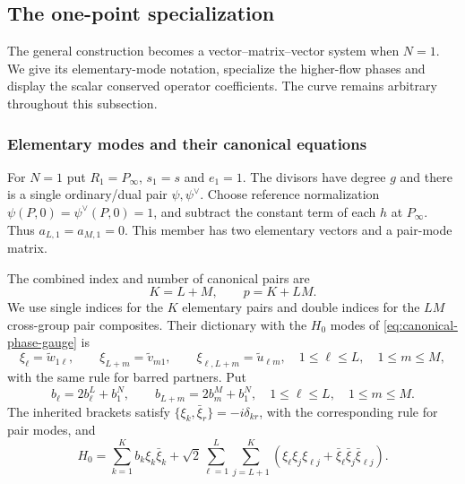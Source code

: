 \subsection{The one-point specialization}
\label{sec:BA-one-point-specialization}

The general construction becomes a vector--matrix--vector system
when $N=1$. We give its elementary-mode notation, specialize the
higher-flow phases and display the scalar conserved operator coefficients.
The curve remains arbitrary throughout this subsection.

\subsubsection{Elementary modes and their canonical equations}
\label{sec:BA-one-point}

For $N=1$ put $R_1=P_\infty$, $s_1=s$ and $e_1=1$.
The divisors have degree $g$ and there is a single ordinary/dual pair
$\psi,\psi^\vee$. Choose reference normalization
$\psi(P,0)=\psi^\vee(P,0)=1$, and subtract the constant term of
each $h$ at $P_\infty$. Thus $a_{L,1}=a_{M,1}=0$.
This member has two elementary vectors and a pair-mode matrix.

The combined index and number of canonical pairs are
\begin{equation}\label{eq:BA-mode-counts}
 K=L+M,\qquad p=K+LM.
\end{equation}
We use single indices for the $K$ elementary pairs and double indices
for the $LM$ cross-group pair composites. Their dictionary with the
$H_0$ modes of \cref{eq:canonical-phase-gauge} is
\begin{equation}\label{eq:BA-mode-dictionary}
 \xi_{\ell}=\tilde w_{1\ell},\qquad
 \xi_{L+m}=\tilde v_{m1},\qquad
 \xi_{\ell,L+m}=\tilde u_{\ell m},
 \quad1\leq\ell\leq L,\quad1\leq m\leq M,
\end{equation}
with the same rule for barred partners. Put
\begin{equation}\label{eq:BA-phase-dictionary}
 b_{\ell}=2b_{\ell}^L+b_1^N,\qquad b_{L+m}=2b_m^M+b_1^N,
 \quad1\leq\ell\leq L,\quad1\leq m\leq M.
\end{equation}
The inherited brackets satisfy $\{\xi_k,\bar\xi_r\}=-i\delta_{kr}$, with the corresponding rule for pair modes, and
\begin{equation}\label{eq:BA-H0-flat}
 H_0=\sum_{k=1}^{K}b_k\xi_k\bar{\xi}_k
 +\sqrt2\sum_{\ell=1}^{L}\sum_{j=L+1}^{K}
 (\xi_{\ell}\xi_j\xi_{\ell j}+\bar{\xi}_{\ell}\bar{\xi}_j\bar{\xi}_{\ell j}).
\end{equation}


